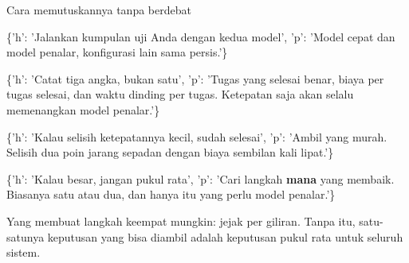 \documentclass[aspectratio=169,11pt,t]{beamer}
\begin{document}
\begin{frame}[shrink=25]{Cara memutuskannya tanpa berdebat}
\begin{isteps}
\item \{'h': 'Jalankan kumpulan uji Anda dengan kedua model', 'p': 'Model cepat dan model penalar, konfigurasi lain sama persis.'\}
\item \{'h': 'Catat tiga angka, bukan satu', 'p': 'Tugas yang selesai benar, biaya per tugas selesai, dan waktu dinding per tugas. Ketepatan saja akan selalu memenangkan model penalar.'\}
\item \{'h': 'Kalau selisih ketepatannya kecil, sudah selesai', 'p': 'Ambil yang murah. Selisih dua poin jarang sepadan dengan biaya sembilan kali lipat.'\}
\item \{'h': 'Kalau besar, jangan pukul rata', 'p': 'Cari langkah \textbf{mana} yang membaik. Biasanya satu atau dua, dan hanya itu yang perlu model penalar.'\}
\end{isteps}
\begin{iband}[signal]
Yang membuat langkah keempat mungkin: jejak per giliran. Tanpa itu, satu-satunya keputusan yang bisa diambil adalah keputusan pukul rata untuk seluruh sistem.
\end{iband}
\end{frame}
\end{document}
